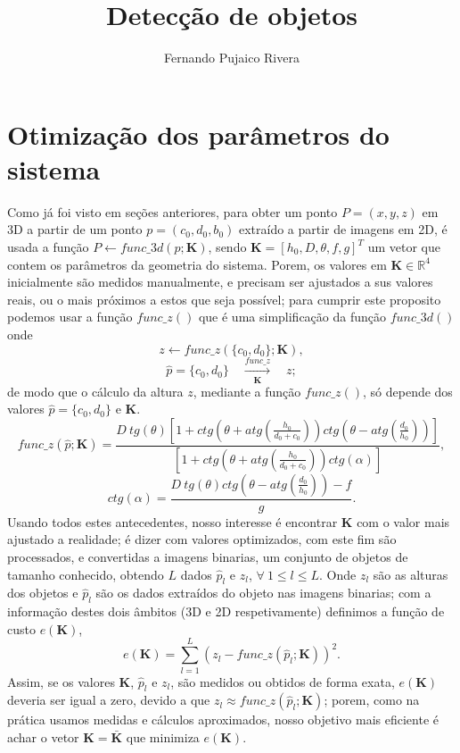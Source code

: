 \documentclass[12pt]{article}
\title{Detecção de objetos }
\author{Fernando Pujaico Rivera}
\date{}
\begin{document}
\maketitle


\section{Otimização dos parâmetros do sistema}
Como já foi visto em seções anteriores, para obter um ponto $P=(x,y,z)$ em 3D a partir de um ponto 
$p=(c_0,d_0,b_0)$ extraído a partir de imagens em 2D, é usada a função
$P \leftarrow func\_3d(p;\mathbf{K})$, sendo $\mathbf{K}=[h_0,D,\theta,f,g]^T$
um vetor que contem os parâmetros da geometria do sistema.
Porem, os valores em $\mathbf{K}\in \mathbb{R}^4$ inicialmente são medidos manualmente,
e precisam ser ajustados a sus valores reais, ou o mais próximos a estos que seja possível;
para cumprir este proposito podemos usar a função $func\_z()$ que é
uma simplificação da função $func\_3d()$ onde 
\begin{equation}
z \leftarrow func\_z(\{c_0,d_0\};\mathbf{K}),
\end{equation}
\begin{equation}
\hat{p}=\{c_0,d_0\}\quad \xrightarrow[\mathbf{K}]{func\_z} \quad z;
\end{equation}
de modo que o cálculo da altura $z$, mediante a função $func\_z()$,
só depende dos valores $\hat{p}=\{c_0,d_0\}$ e $\mathbf{K}$.
\begin{equation}\label{eq:setupz1}
func\_z(\hat{p};\mathbf{K})=\frac{
D~tg(\theta)
\left[
1+ ctg\left(\theta+atg\left(\frac{h_0}{d_0+c_0}\right)\right) ctg\left(\theta-atg\left(\frac{d_0}{h_0}\right)\right) 
\right]
}{
\left[1+ctg\left(\theta+atg\left(\frac{h_0}{d_0+c_0}\right)\right) ctg(\alpha)\right]
},
\end{equation}
\begin{equation}\label{eq:setupz2}
ctg(\alpha)=\frac{D~tg(\theta)ctg\left(\theta-atg\left(\frac{d_0}{h_0}\right)\right)- f}{g}.
\end{equation}
Usando todos estes antecedentes, nosso interesse é encontrar $\mathbf{K}$
com o valor mais ajustado a realidade; é dizer com valores optimizados,
com este fim são processados, e convertidas a imagens binarias, 
um conjunto de objetos de tamanho conhecido,
obtendo $L$ dados $\hat{p}_l$ e $z_l$, $\forall~1\leq l \leq L$.
Onde $z_l$ são as alturas dos objetos e $\hat{p}_l$ 
são os dados extraídos do objeto nas imagens binarias;
com a informação destes dois âmbitos (3D e 2D respetivamente)
definimos a função de custo $e\left(\mathbf{K}\right)$,
\begin{equation}\label{eq:setupz3}
e\left(\mathbf{K}\right)=\sum_{l=1}^{L} \left(z_l-func\_z(\hat{p}_l;\mathbf{K})\right)^2.
\end{equation}
Assim, se os valores $\mathbf{K}$, $\hat{p}_l$ e $z_l$, são medidos ou obtidos de forma exata,
$e\left(\mathbf{K}\right)$ deveria ser igual a zero, devido a que $z_l\approx func\_z(\hat{p}_l;\mathbf{K})$;
porem, como na prática usamos medidas e cálculos aproximados,
nosso objetivo mais eficiente é achar o vetor 
$\mathbf{K}=\mathbf{\bar{K}}$  que minimiza $e\left(\mathbf{K}\right)$.
\end{document}
